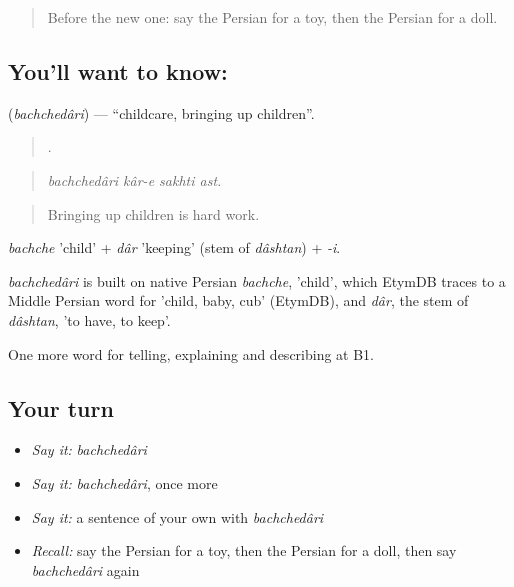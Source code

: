 \label{lesson:FA-C503-bachchedari}



\begin{quote}
Before the new one: say the Persian for a toy, then the Persian for a doll.
\end{quote}

\subsection*{You'll want to know:  }
\textbf{ } (\emph{bachchedâri}) — \textquotedblleft{}childcare, bringing up children\textquotedblright{}.

\begin{quote}
    .
\end{quote}

\begin{quote}
\emph{bachchedâri kâr-e sakhti ast.}
\end{quote}

\begin{quote}
Bringing up children is hard work.
\end{quote}

\emph{bachche} 'child' + \emph{dâr} 'keeping' (stem of \emph{dâshtan}) + \emph{-i}.

\begin{cousinweb}
\emph{bachchedâri} is built on native Persian \emph{bachche}, 'child', which EtymDB traces to a Middle Persian word for 'child, baby, cub' (EtymDB), and \emph{dâr}, the stem of \emph{dâshtan}, 'to have, to keep'.
\end{cousinweb}

\begin{grammarlens}[title={What you've built}]
One more word for telling, explaining and describing at B1.
\end{grammarlens}

\subsection*{Your turn}
\begin{itemize}
\raggedright
  \item \emph{Say it:} \emph{bachchedâri}
  \item \emph{Say it:} \emph{bachchedâri}, once more
  \item \emph{Say it:} a sentence of your own with \emph{bachchedâri}
  \item \emph{Recall:} say the Persian for a toy, then the Persian for a doll, then say \emph{bachchedâri} again
\end{itemize}

